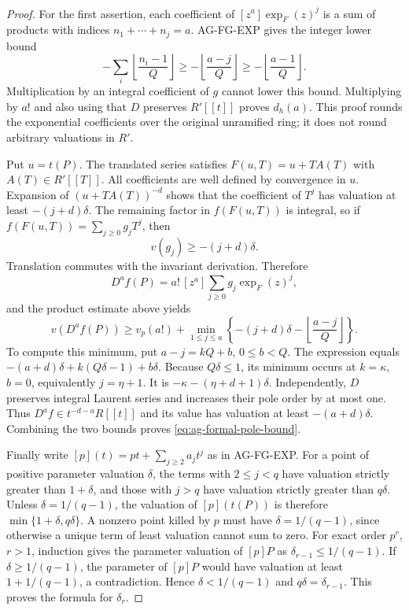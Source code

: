 \begin{proof}
For the first assertion, each coefficient of $[z^a]\exp_F(z)^j$
is a sum of products with indices $n_1+\cdots+n_j=a$.
AG-FG-EXP gives the integer lower bound
\[
 -\sum_i\left\lfloor\frac{n_i-1}{Q}\right\rfloor
 \ge-\left\lfloor\frac{a-j}{Q}\right\rfloor
 \ge-\left\lfloor\frac{a-1}{Q}\right\rfloor.
\]
Multiplication by an integral coefficient of $g$ cannot lower
this bound. Multiplying by $a!$ and also using that $D$ preserves
$R'[[t]]$ proves $d_h(a)$. This proof rounds the exponential
coefficients over the original unramified ring; it does not round
arbitrary valuations in $R'$.

Put $u=t(P)$. The translated series satisfies
$F(u,T)=u+T A(T)$ with $A(T)\in R'[[T]]$.
All coefficients are well defined by convergence in $u$.
Expansion of $(u+TA(T))^{-d}$ shows that the coefficient of
$T^j$ has valuation at least $-(j+d)\delta$.
The remaining factor in $f(F(u,T))$ is integral, so if
$f(F(u,T))=\sum_{j\ge0}g_jT^j$, then
\[
 v(g_j)\ge-(j+d)\delta.
\]
Translation commutes with the invariant derivation. Therefore
\[
 D^af(P)=a!\,[z^a]\sum_{j\ge0}g_j\exp_F(z)^j,
\]
and the product estimate above yields
\[
 v(D^af(P))\ge v_p(a!)+
   \min_{1\le j\le a}
       \left\{-(j+d)\delta-
           \left\lfloor\frac{a-j}{Q}\right\rfloor\right\}.
\]
To compute this minimum, put $a-j=kQ+b$, $0\le b<Q$.
The expression equals
$-(a+d)\delta+k(Q\delta-1)+b\delta$.
Because $Q\delta\le1$, its minimum occurs at
$k=\kappa$, $b=0$, equivalently $j=\eta+1$.
It is $-\kappa-(\eta+d+1)\delta$.
Independently, $D$ preserves integral Laurent series and
increases their pole order by at most one. Thus
$D^af\in t^{-d-a}R[[t]]$ and its value has valuation at least
$-(a+d)\delta$. Combining the two bounds proves
\eqref{eq:ag-formal-pole-bound}.

Finally write
$[p](t)=pt+\sum_{j\ge2}a_jt^j$ as in AG-FG-EXP.
For a point of positive parameter valuation $\delta$, the
terms with $2\le j<q$ have valuation strictly greater than
$1+\delta$, and those with $j>q$ have valuation strictly
greater than $q\delta$. Unless $\delta=1/(q-1)$, the
valuation of $[p](t(P))$ is therefore
$\min\{1+\delta,q\delta\}$. A nonzero point killed by
$p$ must have $\delta=1/(q-1)$, since otherwise a unique
term of least valuation cannot sum to zero.
For exact order $p^r$, $r>1$, induction gives the parameter
valuation of $[p]P$ as $\delta_{r-1}\le1/(q-1)$.
If $\delta\ge1/(q-1)$, the parameter of $[p]P$ would have
valuation at least $1+1/(q-1)$, a contradiction.
Hence $\delta<1/(q-1)$ and $q\delta=\delta_{r-1}$.
This proves the formula for $\delta_r$.
\end{proof}

